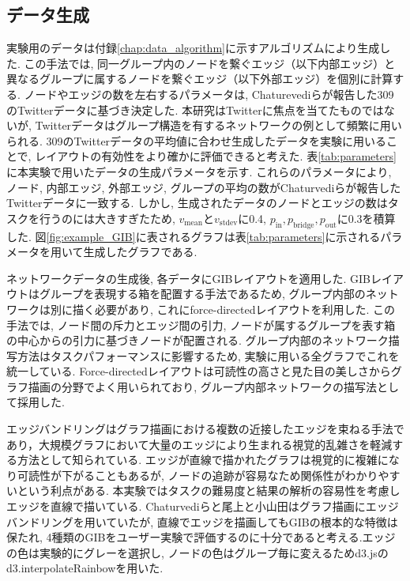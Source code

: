 \documentclass{kuee}
\begin{document}
\subsection{データ生成}
\label{subsec:data_for_ex1}
実験用のデータは付録\ref{chap:data_algorithm}に示すアルゴリズムにより生成した.
この手法では, 同一グループ内のノードを繋ぐエッジ（以下内部エッジ）と異なるグループに属するノードを繋ぐエッジ（以下外部エッジ）を個別に計算する.
ノードやエッジの数を左右するパラメータは, Chaturevediらが報告した309のTwitterデータ\cite{chaturvedi2014group}に基づき決定した.
本研究はTwitterに焦点を当てたものではないが, Twitterデータはグループ構造を有するネットワークの例として頻繁に用いられる.
309のTwitterデータの平均値に合わせ生成したデータを実験に用いることで, レイアウトの有効性をより確かに評価できると考えた.
表\ref{tab:parameters}に本実験で用いたデータの生成パラメータを示す.
これらのパラメータにより, ノード, 内部エッジ, 外部エッジ, グループの平均の数がChaturvediらが報告したTwitterデータに一致する.
しかし, 生成されたデータのノードとエッジの数はタスクを行うのには大きすぎたため, $v_{\text{mean}}$と$v_{\text{stdev}}$に0.4, $p_{\text{in}}, p_{\text{bridge}}, p_{\text{out}}$に0.3を積算した.
図\ref{fig:example_GIB}に表されるグラフは表\ref{tab:parameters}に示されるパラメータを用いて生成したグラフである.

ネットワークデータの生成後, 各データにGIBレイアウトを適用した.
GIBレイアウトはグループを表現する箱を配置する手法であるため, グループ内部のネットワークは別に描く必要があり, これにforce-directedレイアウトを利用した.
この手法では, ノード間の斥力とエッジ間の引力, ノードが属するグループを表す箱の中心からの引力に基づきノードが配置される.
グループ内部のネットワーク描写方法はタスクパフォーマンスに影響するため, 実験に用いる全グラフでこれを統一している.
Force-directedレイアウトは可読性の高さと見た目の美しさからグラフ描画の分野でよく用いられており\cite{Kobourov2013ForceDirectedDA}, グループ内部ネットワークの描写法として採用した.

エッジバンドリングはグラフ描画における複数の近接したエッジを束ねる手法であり，大規模グラフにおいて大量のエッジにより生まれる視覚的乱雑さを軽減する方法として知られている\cite{lhuillier2017state}.
エッジが直線で描かれたグラフは視覚的に複雑になり可読性が下がることもあるが, ノードの追跡が容易なため関係性がわかりやすいという利点がある.
本実験ではタスクの難易度と結果の解析の容易性を考慮しエッジを直線で描いている.
Chaturvediら\cite{chaturvedi2014group}と尾上と小山田\cite{onoue2017optimal}はグラフ描画にエッジバンドリングを用いていたが, 直線でエッジを描画してもGIBの根本的な特徴は保たれ, 4種類のGIBをユーザー実験で評価するのに十分であると考える.エッジの色は実験的にグレーを選択し, ノードの色はグループ毎に変えるためd3.js\cite{Bostock:2011:DDD:2068462.2068631}のd3.interpolateRainbowを用いた.
\end{document}
